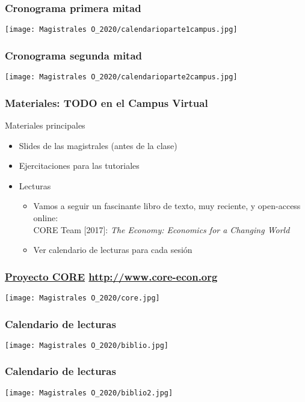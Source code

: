 \documentclass[14pt]{beamer}
\begin{document}
\begin{frame}
\frametitle{Cronograma primera mitad}
\centering
\texttt{[image: Magistrales O\_2020/calendarioparte1campus.jpg]}
\end{frame}

\begin{frame}
\frametitle{Cronograma segunda mitad}
\centering
\texttt{[image: Magistrales O\_2020/calendarioparte2campus.jpg]}
\end{frame}

\begin{frame}
\frametitle{Materiales: TODO en el Campus Virtual}
Materiales principales
\begin{itemize}
    \item Slides de las magistrales (antes de la clase)
    \item Ejercitaciones para las tutoriales
    \item Lecturas
    \begin{itemize}
        \item Vamos a seguir un fascinante libro de texto, muy reciente, y open-access online: \\
        CORE Team [2017]:  \textit{The Economy: Economics for a Changing World}
        \item Ver calendario de lecturas para cada sesión
        \end{itemize}
\end{itemize}
\end{frame}

\begin{frame}
\frametitle{\href{http://www.core-econ.org}{Proyecto CORE} \url{http://www.core-econ.org}}
\centering
\texttt{[image: Magistrales O\_2020/core.jpg]}
\end{frame}

\begin{frame}
\frametitle{Calendario de lecturas}
\centering
\texttt{[image: Magistrales O\_2020/biblio.jpg]}
\end{frame}

\begin{frame}
\frametitle{Calendario de lecturas}
\centering
\texttt{[image: Magistrales O\_2020/biblio2.jpg]}
\end{frame}
\end{document}
